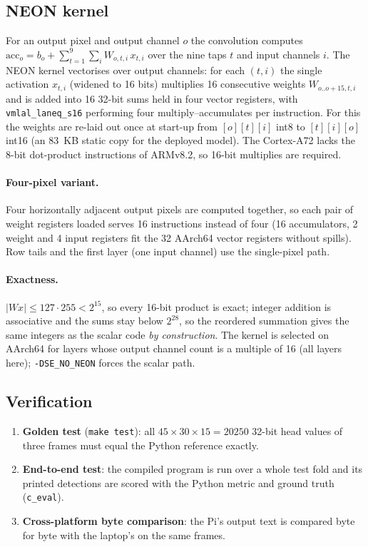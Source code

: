 \documentclass[11pt,a4paper]{article}
\begin{document}
\subsection{NEON kernel}
\label{sec:neon}

For an output pixel and output channel $o$ the convolution computes
$\mathrm{acc}_o = b_o + \sum_{t=1}^{9}\sum_{i} W_{o,t,i}\, x_{t,i}$ over the
nine taps $t$ and input channels $i$. The NEON kernel vectorises over
output channels: for each $(t, i)$ the single activation $x_{t,i}$
(widened to 16 bits) multiplies 16 consecutive weights
$W_{o..o+15,t,i}$ and is added into 16 32-bit sums held in four vector
registers, with \texttt{vmlal\_laneq\_s16} performing four
multiply--accumulates per instruction. For this the weights are re-laid
out once at start-up from $[o][t][i]$ int8 to $[t][i][o]$ int16 (an 83~KB
static copy for the deployed model). The Cortex-A72 lacks the 8-bit
dot-product instructions of ARMv8.2, so 16-bit multiplies are required.

\paragraph{Four-pixel variant.} Four horizontally adjacent output pixels
are computed together, so each pair of weight registers loaded serves 16
instructions instead of four (16 accumulators, 2 weight and 4 input
registers fit the 32 AArch64 vector registers without spills). Row tails and
the first layer (one input channel) use the single-pixel path.

\paragraph{Exactness.} $|W x| \le 127 \cdot 255 < 2^{15}$, so every 16-bit
product is exact; integer addition is associative and the sums stay below
$2^{28}$, so the reordered summation gives the same integers as the scalar
code \emph{by construction}. The kernel is selected on AArch64 for layers
whose output channel count is a multiple of 16 (all layers here);
\texttt{-DSE\_NO\_NEON} forces the scalar path.

\subsection{Verification}
\label{sec:verify}

\begin{enumerate}
  \item \textbf{Golden test} (\texttt{make test}): all $45 \times 30
        \times 15 = \num{20250}$ 32-bit head values of three frames must equal
        the Python reference exactly.
  \item \textbf{End-to-end test}: the compiled program is run over a whole
        test fold and its printed detections are scored with the Python
        metric and ground truth (\texttt{c\_eval}).
  \item \textbf{Cross-platform byte comparison}: the Pi's output text is
        compared byte for byte with the laptop's on the same frames.
\end{enumerate}
\end{document}
